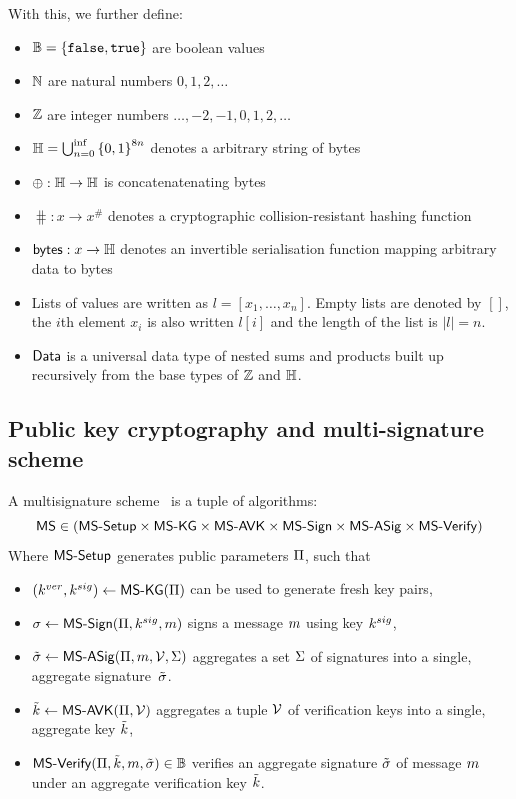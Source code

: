 \noindent With this, we further define:
\begin{itemize}
  \item $\mathbb{B} = \{\mathtt{false}, \mathtt{true}\}$ are boolean values
  \item $\mathbb{N}$ are natural numbers ${0, 1, 2, \ldots}$
  \item $\mathbb{Z}$ are integer numbers ${\ldots, −2, −1, 0, 1, 2, \ldots}$
  \item $\mathbb{H} = \bigcup_{n=0}^{\inf}{\{0,1\}}^{8n}$ denotes a arbitrary
        string of bytes
  \item $\oplus : \mathbb{H} \to \mathbb{H}$ is concatenatenating bytes
  \item $\hash : x \to x^{\#}$ denotes a cryptographic collision-resistant
        hashing function
  \item $\mathsf{bytes} : x \to \mathbb{H}$ denotes an invertible serialisation function
        mapping arbitrary data to bytes
  \item Lists of values are written as $l = [x_{1}, \ldots, x_{n}]$. Empty lists
        are denoted by $[]$, the $i$th element $x_{i}$ is also written $l[i]$
        and the length of the list is $|l| = n$.
  \item $\mathsf{Data}$ is a universal data type of nested sums and products built up
        recursively from the base types of $\mathbb{Z}$ and $\mathbb{H}$.
\end{itemize}

\subsection{Public key cryptography and multi-signature scheme}\label{sec:multisig}

A multisignature scheme~\cite{itakura1983public,CCS:MicOhtRey01} is a
tuple of algorithms:
\[
\mathsf{MS} \in (\mathsf{MS\textsf{-}{}Setup} \times \allowbreak\mathsf{MS\textsf{-}{}KG} \times \allowbreak\mathsf{MS\textsf{-}{}AVK} \times \allowbreak
\mathsf{MS\textsf{-}{}Sign} \times \allowbreak\mathsf{MS\textsf{-}{}ASig} \times \allowbreak\mathsf{MS\textsf{-}{}Verify})
\]
Where $\mathsf{MS\textsf{-}{}Setup}$ generates public parameters $\Pi$, such that
\begin{itemize}
  \item $(k^{ver},k^{sig}) \gets \mathsf{MS\textsf{-}{}KG}(\Pi)$ can be used to generate fresh
        key pairs,
  \item $\sigma \gets \mathsf{MS\textsf{-}{}Sign}(\Pi,k^{sig},m)$ signs a message $m$
        using key $k^{sig}$,
  \item $\tilde\sigma \gets \mathsf{MS\textsf{-}{}ASig}(\Pi,m,\mathcal{V},\Sigma)$ aggregates
         a set $\Sigma$ of signatures into a single,
        aggregate signature~$\tilde\sigma$.
  \item $\tilde{k} \gets \mathsf{MS\textsf{-}{}AVK}(\Pi,\mathcal{V})$ aggregates a tuple
        $\mathcal{V}$ of verification keys into a single, aggregate key
        $\tilde{k}$,
  \item $\mathsf{MS\textsf{-}{}Verify}(\Pi,\tilde{k},m,\tilde\sigma) \in \mathbb{B}$ verifies an aggregate
        signature $\tilde\sigma$ of message $m$ under an aggregate verification
        key $\tilde{k}$.
\end{itemize}

